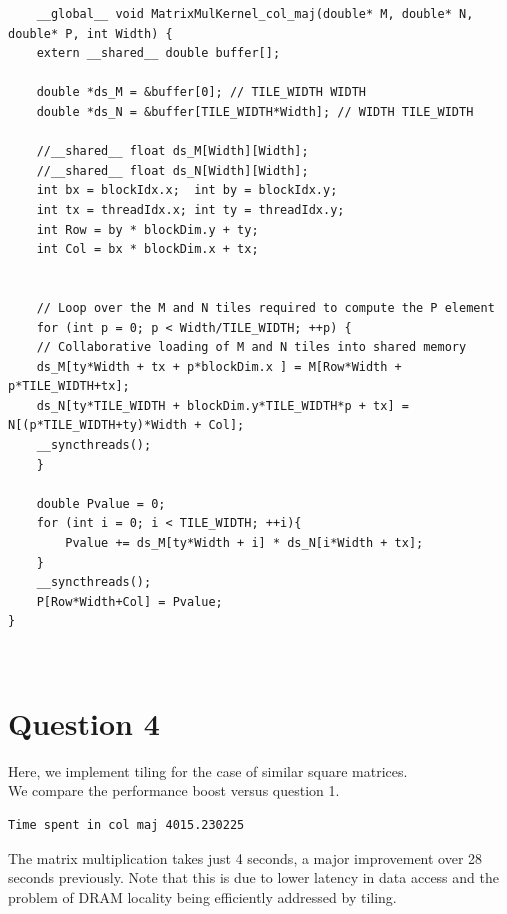 \begin{lstlisting}
	__global__ void MatrixMulKernel_col_maj(double* M, double* N, double* P, int Width) { 
    extern __shared__ double buffer[];

    double *ds_M = &buffer[0]; // TILE_WIDTH WIDTH
    double *ds_N = &buffer[TILE_WIDTH*Width]; // WIDTH TILE_WIDTH

    //__shared__ float ds_M[Width][Width];
    //__shared__ float ds_N[Width][Width];
    int bx = blockIdx.x;  int by = blockIdx.y;
    int tx = threadIdx.x; int ty = threadIdx.y;
    int Row = by * blockDim.y + ty;
    int Col = bx * blockDim.x + tx;
    
    
    // Loop over the M and N tiles required to compute the P element
    for (int p = 0; p < Width/TILE_WIDTH; ++p) {
    // Collaborative loading of M and N tiles into shared memory
    ds_M[ty*Width + tx + p*blockDim.x ] = M[Row*Width + p*TILE_WIDTH+tx];
    ds_N[ty*TILE_WIDTH + blockDim.y*TILE_WIDTH*p + tx] = N[(p*TILE_WIDTH+ty)*Width + Col];
    __syncthreads();
    }

    double Pvalue = 0;
    for (int i = 0; i < TILE_WIDTH; ++i){
        Pvalue += ds_M[ty*Width + i] * ds_N[i*Width + tx];
    }
    __syncthreads();
    P[Row*Width+Col] = Pvalue;
}
\end{lstlisting} \\

\section {Question 4}

Here, we implement tiling for the case of similar square matrices. \\

We compare the performance boost versus question 1.

\begin{lstlisting}[numbers = none]
Time spent in col maj 4015.230225
\end{lstlisting} 

The matrix multiplication takes just 4 seconds, a major improvement over 28 seconds previously. Note that this is due to lower latency in data access and the problem of DRAM locality being efficiently addressed by tiling.

